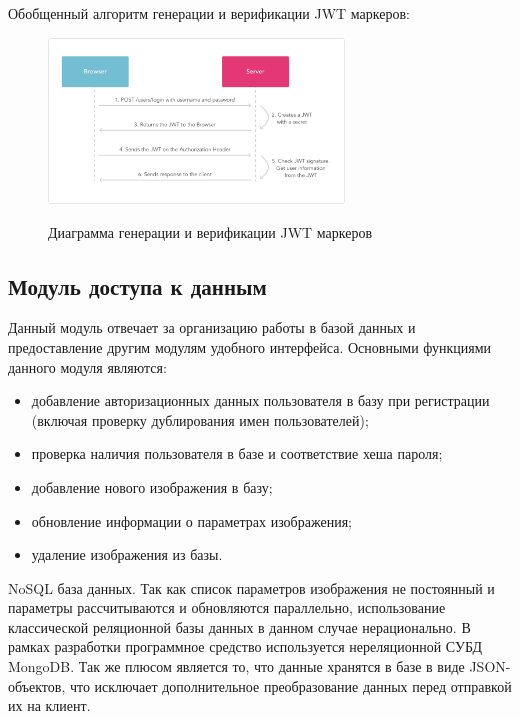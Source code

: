 Обобщенный алгоритм генерации и верификации JWT маркеров:
\begin{figure}[ht]
    \centering
    \includegraphics[width=0.7\textwidth]{figures/jwt_diagram.png}
    \label{fig:architecture:jwt_diagram}
    \caption{Диаграмма генерации и верификации JWT маркеров}
\end{figure}

\subsection{Модуль доступа к данным}
Данный модуль отвечает за организацию работы в базой данных и предоставление другим модулям удобного интерфейса.
Основными функциями данного модуля являются:
\begin{itemize}
  \item добавление авторизационных данных пользователя в базу при регистрации (включая проверку дублирования имен пользователей);
  \item проверка наличия пользователя в базе и соответствие хеша пароля;
  \item добавление нового изображения в базу;
  \item обновление информации о параметрах изображения;
  \item удаление изображения из базы.
\end{itemize}

NoSQL база данных. Так как список параметров изображения не постоянный и параметры рассчитываются и обновляются параллельно, использование классической реляционной базы данных в данном случае нерационально. В рамках разработки программное средство используется нереляционной СУБД MongoDB. Так же плюсом является то, что данные хранятся в базе в виде JSON-объектов, что исключает дополнительное преобразование данных перед отправкой их на клиент.